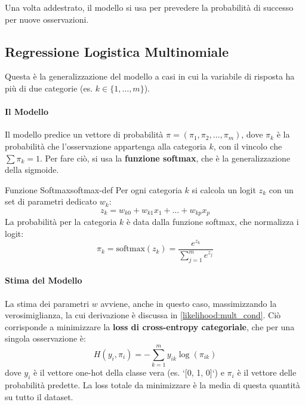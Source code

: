 Una volta addestrato, il modello si usa per prevedere la probabilità di
successo per nuove osservazioni.

\subsection{Regressione Logistica Multinomiale}
Questa è la generalizzazione del modello a casi in cui la variabile di risposta
ha più di due categorie (es. \(k \in \{1, \dots, m\}\)).

\paragraph{Il Modello}
Il modello predice un vettore di probabilità \(\pi = (\pi_1, \pi_2, \dots,
\pi_m)\), dove \(\pi_k\) è la probabilità che l'osservazione appartenga alla
categoria \(k\), con il vincolo che \(\sum \pi_k = 1\). Per fare ciò, si usa la
\textbf{funzione softmax}, che è la generalizzazione della sigmoide.

\begin{definizione}{Funzione Softmax}{softmax-def}
Per ogni categoria \(k\) si calcola un logit \(z_k\) con un set di parametri
dedicato \(w_k\):
\[
    z_k = w_{k0} + w_{k1}x_1 + \dots + w_{kp}x_p
\]
La probabilità per la categoria \(k\) è data dalla funzione softmax, che
normalizza i logit:
\[
    \pi_k = \text{softmax}(z_k) = \frac{e^{z_k}}{\sum_{j=1}^{m} e^{z_j}}
\]
\end{definizione}

\paragraph{Stima del Modello}
La stima dei parametri \(w\) avviene, anche in questo caso, massimizzando la
verosimiglianza, la cui derivazione è discussa in \ref{likelihood:mult_cond}.
Ciò corrisponde a minimizzare la \textbf{loss di cross-entropy categoriale},
che per una singola osservazione è:
\[ H(y_i, \pi_i) = - \sum_{k=1}^{m} y_{ik} \log(\pi_{ik}) \]
dove \(y_i\) è il vettore one-hot della classe vera (es. `[0, 1, 0]`) e
\(\pi_i\) è il vettore delle probabilità predette. La loss totale da
minimizzare è la media di questa quantità su tutto il dataset.

